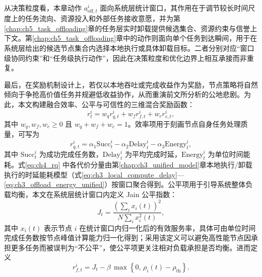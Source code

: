 从决策粒度看，本章动作 $a_{\mathrm{off},t}^i$ 面向系统层统计窗口，其作用在于调节较长时间尺度上的任务流向、资源投入和外部任务接收意愿，并为第\ref{chap:ch5_task_offloading}章的任务层实时卸载提供候选集合、资源约束与信誉上下文。第\ref{chap:ch5_task_offloading}章中的动作则面向单个任务到达瞬间，用于在系统层给出的候选节点集合内选择本地执行或具体卸载目标。二者分别对应“窗口级协同约束”和“任务级执行动作”，因此在决策粒度和优化边界上相互承接而非重复。

最后，在奖励机制设计上，若仅以本地吞吐或完成收益作为奖励，节点策略将自然倾向于争抢高价值任务并规避低收益协作，从而重演前文所分析的公地悲剧。为此，本文构建融合效率、公平与可信性的三维混合奖励函数：
\begin{equation}
    r_t^i = w_q r_{q,t}^i + w_f r_{f,t}^i + w_c r_{c,t}^i,
    \label{eq:ch4_hybrid_reward}
\end{equation}
其中 $w_q,w_f,w_c\ge 0$ 且 $w_q+w_f+w_c=1$。效率项用于刻画节点自身任务处理质量，可写为
\begin{equation}
    r_{q,t}^i = \alpha_1\mathrm{Succ}_t^i - \alpha_2\mathrm{Delay}_t^i - \alpha_3\mathrm{Energy}_t^i,
    \label{eq:ch4_rq}
\end{equation}
其中 $\mathrm{Succ}_t^i$ 为成功完成任务数，$\mathrm{Delay}_t^i$ 为平均完成时延，$\mathrm{Energy}_t^i$ 为单位时间能耗。式\eqref{eq:ch4_rq} 中各代价分量由第\ref{chap:ch3_unified_model}章本地执行/卸载执行的时延能耗模型（式\eqref{eq:ch3_local_compute_delay}—\eqref{eq:ch3_offload_energy_unified}）按窗口聚合得到。公平项用于引导系统整体负载均衡，本文在系统层统计窗口内定义 Jain 公平指数\cite{Jain1984}：
\begin{equation}
    J_t = \frac{\left(\sum_i x_i(t)\right)^2}{N\sum_i x_i^2(t)},
    \label{eq:ch4_jain}
\end{equation}
其中 $x_i(t)$ 表示节点 $i$ 在统计窗口内归一化后的有效服务率，具体可由单位时间完成任务数按节点峰值计算能力归一化得到；采用该定义可以避免高性能节点因承担更多任务而被误判为“不公平”，使公平项更关注相对负载承担是否均衡。进而定义
\begin{equation}
    r_{f,t}^i = J_t - \beta\,\max\left\{0,\,\rho_i(t)-\rho_{\mathrm{th}}\right\}.
    \label{eq:ch4_rf}
\end{equation}

